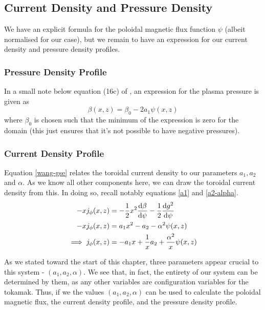 \subsection{Current Density and Pressure Density}
We have an explicit formula for the poloidal magnetic flux function $\psi$ (albeit normalised for our case), but we remain to have an 
expression for our current density and pressure density profiles.

\subsubsection{Pressure Density Profile}
In a small note below equation (16c) of \cite{wang-analytic-solution}, an expression for the plasma pressure is given as
\begin{equation}
    \label{pressure-profile} \beta(x,z) = \beta_0 - 2a_1 \psi(x,z)
\end{equation}
where $\beta_0$ is chosen such that the minimum of the expression is zero for the domain (this just ensures that it's not possible 
to have negative pressures).

\subsubsection{Current Density Profile}
Equation \ref{wang-gse} relates the toroidal current density to our parameters $a_1, a_2$ and $\alpha$. As we know 
all other components here, we can draw the toroidal current density from this. In doing so, recall notably equations \ref{a1} and \ref{a2-alpha}.
\begin{align}
    \notag -xj_{\phi}(x,z) &= -\frac{1}{2}x^2 \dv{\beta}{\psi} - \frac{1}{2} \dv{g^2}{\psi} \\
    \notag -xj_{\phi}(x,z) &= a_1 x^2 - a_2 - \alpha^2 \psi(x,z) \\
    \label{current-profile} \implies j_{\phi}(x,z) &= -a_1 x + \frac{1}{x} a_2 + \frac{\alpha^2}{x} \psi(x,z)
\end{align}

\begin{remark}
    As we stated toward the start of this chapter, three parameters appear crucial to this system - $(a_1, a_2, \alpha)$. We see that, in fact, 
    the entirety of our system can be determined by them, as any other variables are configuration variables for the tokamak. Thus, if we 
    the values $(a_1, a_2, \alpha)$ can be used to calculate the poloidal magnetic flux, the current density profile, and the 
    pressure density profile.
\end{remark}

